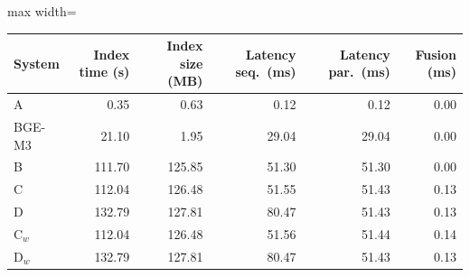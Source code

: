 \begin{adjustbox}{max width=\linewidth}
\begin{tabular}{lrrrrr}
\toprule
System & Index time (s) & Index size (MB) & Latency seq.\ (ms) & Latency par.\ (ms) & Fusion (ms) \\
\midrule
A & 0.35 & 0.63 & 0.12 & 0.12 & 0.00 \\
BGE-M3 & 21.10 & 1.95 & 29.04 & 29.04 & 0.00 \\
B & 111.70 & 125.85 & 51.30 & 51.30 & 0.00 \\
C & 112.04 & 126.48 & 51.55 & 51.43 & 0.13 \\
D & 132.79 & 127.81 & 80.47 & 51.43 & 0.13 \\
C$_w$ & 112.04 & 126.48 & 51.56 & 51.44 & 0.14 \\
D$_w$ & 132.79 & 127.81 & 80.47 & 51.43 & 0.13 \\
\bottomrule
\end{tabular}
\end{adjustbox}
\par{}
